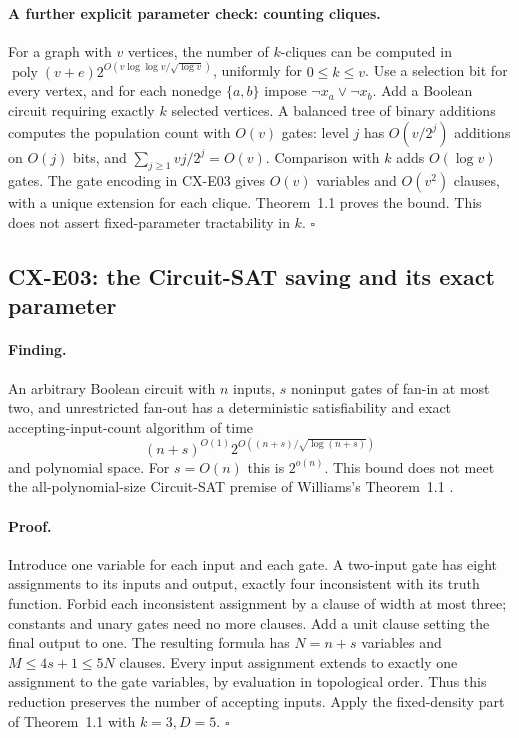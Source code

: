 \documentclass[11pt,a4paper]{article}
\begin{document}
\paragraph{A further explicit parameter check: counting cliques.}
For a graph with \(v\) vertices, the number of \(k\)-cliques can be
computed in
\(\operatorname{poly}(v+e)
 2^{O(v\log\log v/\sqrt{\log v})}\),
uniformly for \(0\leq k\leq v\).
Use a selection bit for every vertex, and for each nonedge
\(\{a,b\}\) impose \(\neg x_a\vee\neg x_b\).
Add a Boolean circuit requiring exactly \(k\) selected vertices.
A balanced tree of binary additions computes the population count
with \(O(v)\) gates: level \(j\) has \(O(v/2^j)\) additions on
\(O(j)\) bits, and
\(\sum_{j\geq1}vj/2^j=O(v)\).
Comparison with \(k\) adds \(O(\log v)\) gates.
The gate encoding in CX-E03 gives \(O(v)\) variables and \(O(v^2)\)
clauses, with a unique extension for each clique.
Theorem~1.1 proves the bound. This does not assert fixed-parameter
tractability in \(k\).
\hfill\(\square\)

\subsection{CX-E03: the Circuit-SAT saving and its exact parameter}
\label{finding:CX-E03}

\paragraph{Finding.}
An arbitrary Boolean circuit with \(n\) inputs, \(s\) noninput gates
of fan-in at most two, and unrestricted fan-out has a deterministic
satisfiability and exact accepting-input-count algorithm of time
\[
 (n+s)^{O(1)}
 2^{O((n+s)/\sqrt{\log(n+s)})}
\]
and polynomial space.
For \(s=O(n)\) this is \(2^{o(n)}\).
This bound does not meet the all-polynomial-size Circuit-SAT premise
of Williams's Theorem~1.1 \cite[Theorem~1.1]{Williams2013}.

\paragraph{Proof.}
Introduce one variable for each input and each gate.
A two-input gate has eight assignments to its inputs and output,
exactly four inconsistent with its truth function.
Forbid each inconsistent assignment by a clause of width at most
three; constants and unary gates need no more clauses.
Add a unit clause setting the final output to one.
The resulting formula has \(N=n+s\) variables and
\(M\leq4s+1\leq5N\) clauses.
Every input assignment extends to exactly one assignment to the gate
variables, by evaluation in topological order.
Thus this reduction preserves the number of accepting inputs.
Apply the fixed-density part of Theorem~1.1 with \(k=3,D=5\).
\hfill\(\square\)
\end{document}
